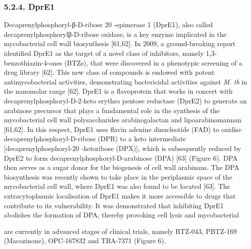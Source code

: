 \documentclass{article}
\begin{document}
\subsubsection{5.2.4. DprE1}

Decaprenylphosphoryl-β-D-ribose 20 -epimerase 1 (DprE1), also called decaprenylphosphorylβ-D-ribose oxidase, is a key enzyme implicated in the mycobacterial cell wall biosynthesis [61,62]. In 2009, a ground-breaking report identified DprE1 as the target of a novel class of inhibitors, namely 1,3-benzothiazin-4-ones (BTZs), that were discovered in a phenotypic screening of a drug library [62]. This new class of compounds is endowed with potent antimycobacterial activities, demonstrating bactericidal activities against \textit{M. tb} in the nanomolar range [62]. DprE1 is a flavoprotein that works in concert with decaprenylphosphoryl-D-2-keto erythro pentose reductase (DprE2) to generate an arabinose precursor that plays a fundamental role in the synthesis of the mycobacterial cell wall polysaccharides arabinogalactan and lipoarabinomannan [61,62]. In this respect, DprE1 uses flavin adenine dinucleotide (FAD) to oxidise decaprenylphosphoryl-D-ribose (DPR) to a keto intermediate [decaprenylphosphoryl-20 -ketoribose (DPX)], which is subsequently reduced by DprE2 to form decaprenylphosphoryl-D-arabinose (DPA) [63] (Figure 6). DPA then serves as a sugar donor for the biogenesis of cell wall arabinans. The DPA biosynthesis was recently shown to take place in the periplasmic space of the mycobacterial cell wall, where DprE1 was also found to be located [63]. The extracytoplasmic localisation of DprE1 makes it more accessible to drugs that contribute to its vulnerability. It was demonstrated that inhibiting DprE1 abolishes the formation of DPA, thereby provoking cell lysis and mycobacterial

are currently in advanced stages of clinical trials, namely BTZ-043, PBTZ-169 (Macozinone), OPC-167832 and TBA-7371 (Figure 6).
\end{document}

